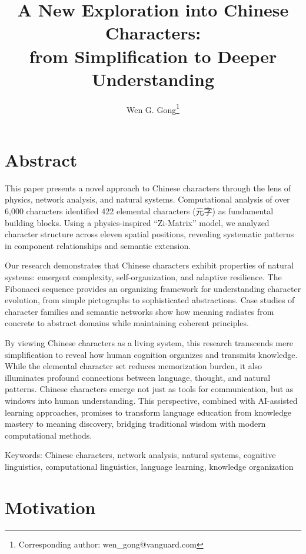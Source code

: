 \documentclass[11pt,letterpaper]{article}
\title{A New Exploration into Chinese Characters: \\ from Simplification to Deeper Understanding}\label{a-new-exploration-into-chinese-characters-from-simplification-to-deeper-understanding}
\author{Wen G. Gong\thanks{Corresponding author: wen\_gong@vanguard.com}}
\date{}   %
\begin{document}
\maketitle


\section{Abstract}\label{abstract}

This paper presents a novel approach to Chinese characters through the
lens of physics, network analysis, and natural systems. Computational
analysis of over 6,000 characters identified 422 elemental characters
(元字) as fundamental building blocks. Using a physics-inspired
``Zi-Matrix'' model, we analyzed character structure across eleven
spatial positions, revealing systematic patterns in component
relationships and semantic extension.

Our research demonstrates that Chinese characters exhibit properties of
natural systems: emergent complexity, self-organization, and adaptive
resilience. The Fibonacci sequence provides an organizing framework for
understanding character evolution, from simple pictographs to
sophisticated abstractions. Case studies of character families and
semantic networks show how meaning radiates from concrete to abstract
domains while maintaining coherent principles.

By viewing Chinese characters as a living system, this research
transcends mere simplification to reveal how human cognition organizes
and transmits knowledge. While the elemental character set reduces
memorization burden, it also illuminates profound connections between
language, thought, and natural patterns. Chinese characters emerge not
just as tools for communication, but as windows into human
understanding. This perspective, combined with AI-assisted learning
approaches, promises to transform language education from knowledge
mastery to meaning discovery, bridging traditional wisdom with modern
computational methods.

Keywords: Chinese characters, network analysis, natural systems,
cognitive linguistics, computational linguistics, language learning,
knowledge organization

\section{Motivation}\label{motivation}
\end{document}
